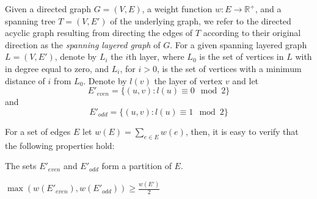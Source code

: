 Given a directed graph $G = (V, E)$,
a weight function $w : E \rightarrow \mathbb{R^+}$, 
and a spanning tree $T = (V, E')$ of the underlying graph, 
we refer to the directed acyclic graph resulting from directing the edges 
of $T$ according to their original direction as the \emph{spanning layered graph}
of $G$.
For a given spanning layered graph $L = (V, E')$, denote by $L_i$ the $i$th
layer, where $L_0$ is the set of vertices in $L$ with in degree equal to zero,
and $L_i$, for $i > 0$, is the set of vertices with a minimum distance of $i$ from $L_0$.
Denote by $l(v)$ the layer of vertex $v$ and let 
$$ E'_{even} = \{ (u, v) : l(u) \equiv 0 \mod 2 \} $$
and    
$$ E'_{odd} = \{ (u, v) : l(u) \equiv 1 \mod 2 \} $$

For a set of edges $E$ let $w(E) = \sum_{e \in E}{w(e)}$, 
then, it is easy to verify that the following properties hold:

\begin{observation}
The sets $E'_{even}$ and $E'_{odd}$ form a partition of $E$. 
\end{observation}

\begin{observation}
\label{ob:geq_half}
$ \max(w(E'_{even}), w(E'_{odd}))  \geq \frac{w(E')}{2} $
\end{observation}